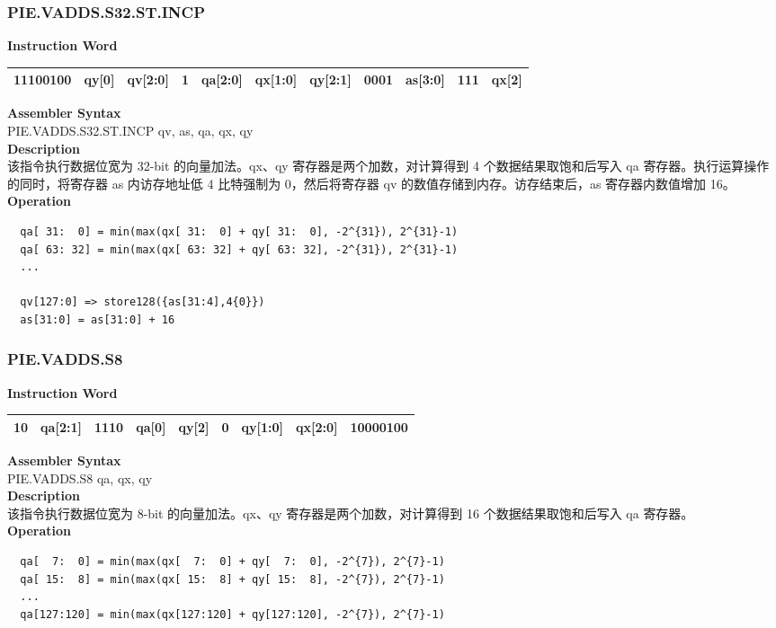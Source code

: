 \newpage
\subsubsection{PIE.VADDS.S32.ST.INCP}\label{instruction:PIEVADDSS32STINCP}
\setlength\tabcolsep{6pt}
\textbf{Instruction Word} \\
\begin{tabular}{|c|c|c|c|c|c|c|c|c|c|c|}
	\hline
	11100100 & qy[0] & qv[2:0] & 1 & qa[2:0] & qx[1:0] & qy[2:1] & 0001 & as[3:0] & 111 & qx[2] \\
	\hline
\end{tabular}

\textbf{Assembler Syntax} \\
PIE.VADDS.S32.ST.INCP qv, as, qa, qx, qy \\
\textbf{Description} \\
该指令执行数据位宽为 32-bit 的向量加法。qx、qy 寄存器是两个加数，对计算得到 4 个数据结果取饱和后写入 qa 寄存器。执行运算操作的同时，将寄存器 as 内访存地址低 4 比特强制为 0，然后将寄存器 qv 的数值存储到内存。访存结束后，as 寄存器内数值增加 16。\\
\textbf{Operation}
\begin{lstlisting}
  qa[ 31:  0] = min(max(qx[ 31:  0] + qy[ 31:  0], -2^{31}), 2^{31}-1)
  qa[ 63: 32] = min(max(qx[ 63: 32] + qy[ 63: 32], -2^{31}), 2^{31}-1)
  ...

  qv[127:0] => store128({as[31:4],4{0}})
  as[31:0] = as[31:0] + 16
\end{lstlisting}

\newpage
\subsubsection{PIE.VADDS.S8}\label{instruction:PIEVADDSS8}
\setlength\tabcolsep{6pt}
\textbf{Instruction Word} \\
\begin{tabular}{|c|c|c|c|c|c|c|c|c|}
	\hline
	10 & qa[2:1] & 1110 & qa[0] & qy[2] & 0 & qy[1:0] & qx[2:0] & 10000100 \\
	\hline
\end{tabular}

\textbf{Assembler Syntax} \\
PIE.VADDS.S8 qa, qx, qy \\
\textbf{Description} \\
该指令执行数据位宽为 8-bit 的向量加法。qx、qy 寄存器是两个加数，对计算得到 16 个数据结果取饱和后写入 qa 寄存器。\\
\textbf{Operation}
\begin{lstlisting}
  qa[  7:  0] = min(max(qx[  7:  0] + qy[  7:  0], -2^{7}), 2^{7}-1)
  qa[ 15:  8] = min(max(qx[ 15:  8] + qy[ 15:  8], -2^{7}), 2^{7}-1)
  ...
  qa[127:120] = min(max(qx[127:120] + qy[127:120], -2^{7}), 2^{7}-1)
\end{lstlisting}

